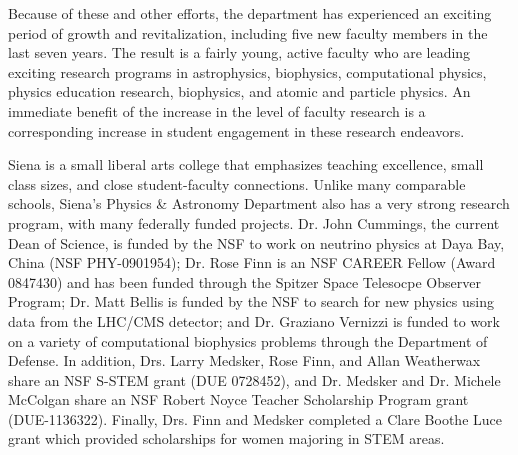 \documentclass[11pt, preprint]{aastex}
\begin{document}
Because of these and other efforts, the department has experienced an exciting
period of growth and revitalization, including five new faculty members in the
last seven years.  The result is a fairly young, active faculty who are leading
exciting research programs in astrophysics, biophysics, computational physics,
physics education research, biophysics, and atomic and particle physics. An
immediate benefit of the increase in the level of faculty research is a
corresponding increase in student engagement in these research endeavors.


				
Siena is a small liberal arts college that emphasizes teaching excellence, small
class sizes, and close student-faculty connections. Unlike many comparable
schools, Siena's Physics \& Astronomy Department also has a very strong research
program, with many federally funded projects. Dr. John Cummings, the current
Dean of Science, is funded by the NSF to work on neutrino physics at Daya Bay,
China (NSF PHY-0901954); Dr. Rose Finn is an NSF CAREER Fellow (Award
0847430) and has been funded through the Spitzer Space Telesocpe
Observer Program;
Dr. Matt Bellis is funded by the NSF to search for new physics using data from
the LHC/CMS detector; and Dr. Graziano Vernizzi is funded to work on a variety
of computational biophysics problems through the Department of Defense.  In
addition, Drs. Larry Medsker, Rose Finn, and Allan Weatherwax share an NSF
S-STEM grant (DUE 0728452), and Dr. Medsker and Dr. Michele McColgan share an
NSF Robert Noyce Teacher Scholarship Program grant (DUE-1136322).  Finally,
Drs. Finn and Medsker completed a Clare Boothe Luce grant which
provided scholarships for women majoring in STEM areas.
\end{document}
